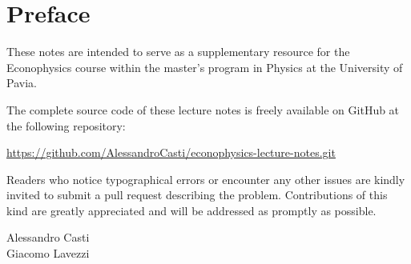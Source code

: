 \chapter*{Preface}

These notes are intended to serve as a supplementary resource for the 
Econophysics course within the master’s program in Physics at the 
University of Pavia.

The complete source code of these lecture notes is freely available on 
GitHub at the following repository:

\begin{center}
    \url{https://github.com/AlessandroCasti/econophysics-lecture-notes.git}
\end{center}

\vspace{\baselineskip}
Readers who notice typographical errors or encounter any other issues 
are kindly invited to submit a pull request describing the problem. 
Contributions of this kind are greatly appreciated and will be addressed 
as promptly as possible.


\bigskip
\begin{flushright}
Alessandro Casti \\
Giacomo Lavezzi
\end{flushright}
